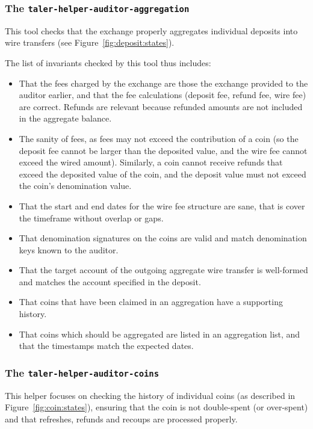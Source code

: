 \subsubsection{The \texttt{taler-helper-auditor-aggregation}}

This tool checks that the exchange properly aggregates
individual deposits into wire transfers
(see Figure~\ref{fig:deposit:states}).  

The list of invariants checked by this tool thus includes:
\begin{itemize}
\item That the fees charged by the exchange are those
  the exchange provided to the auditor earlier, and that the
  fee calculations (deposit fee, refund fee, wire fee)
  are correct.  Refunds are relevant because refunded amounts
  are not included in the aggregate balance.
\item The sanity of fees, as fees may not exceed the contribution
  of a coin (so the deposit fee cannot be larger than the
  deposited value, and the wire fee cannot exceed the
  wired amount).  Similarly, a coin cannot receive refunds
  that exceed the deposited value of the coin, and the
  deposit value must not exceed the coin's denomination value.
\item That the start and end dates for the wire
  fee structure are sane, that is cover the timeframe without
  overlap or gaps.
\item That denomination signatures on the coins are valid
  and match denomination keys known to the auditor.
\item That the target account of the outgoing aggregate wire
  transfer is well-formed and matches the account specified
  in the deposit.
\item That coins that have been claimed in an aggregation have
  a supporting history.
\item That coins which should be aggregated are listed in an
  aggregation list, and that the timestamps match the
  expected dates.
\end{itemize}


\subsubsection{The \texttt{taler-helper-auditor-coins}}

This helper focuses on checking the history of individual coins (as described
in Figure~\ref{fig:coin:states}), ensuring that the coin is not double-spent
(or over-spent) and that refreshes, refunds and recoups are processed
properly.


